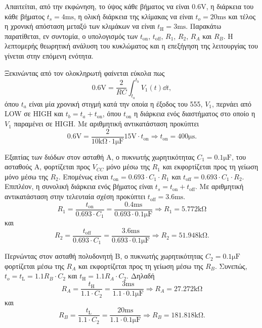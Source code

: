 Απαιτείται, από την εκφώνηση, το ύψος κάθε βήματος να είναι $0.6\unit{\volt}$, η διάρκεια του κάθε βήματος $t_s=4\unit{\ms}$, η ολική διάρκεια της κλίμακας να είναι $t_o=20\unit{\ms}$ και τέλος η χρονική απόσταση μεταξύ των κλιμάκων να είναι $t_{\mathrm{H}}=3\unit{\ms}$. Παρακάτω παρατίθεται, εν συντομία, ο υπολογισμός των $t_{\mathrm{on}}$, $t_{\mathrm{off}}$, $R_1$, $R_2$, $R_A$ και $R_B$. Η λεπτομερής θεωρητική ανάλυση του κυκλώματος και η επεξήγηση της λειτουργίας του γίνεται στην επόμενη ενότητα.\par
Ξεκινώντας από τον ολοκληρωτή φαίνεται εύκολα πως
\begin{equation*}
	0.6\unit{\volt}=\frac{2}{RC}\int_{t_a}^{t_b}{V_1(t)\dd{t}},
\end{equation*}
όπου $t_a$ είναι μία χρονική στιγμή κατά την οποία η έξοδος του 555, $V_1$, περνάει από LOW σε HIGH και $t_b=t_a+t_{\mathrm{on}}$, όπου $t_{\mathrm{on}}$ η διάρκεια ενός διαστήματος στο οποίο η $V_1$ παραμένει σε HIGH. Με αριθμητική αντικατάσταση προκύπτει
\begin{equation*}
	0.6\unit{\volt}=\frac{2}{10\unit{\kilo\ohm}\cdot 1\unit{\micro\farad}}15\unit{\volt}\cdot t_{\mathrm{on}}\Rightarrow t_{\mathrm{on}}=400\unit{\micro\second}.
\end{equation*}

Εξαιτίας των διόδων στον ασταθή Α, ο πυκνωτής χωρητικότητας $C_1=0.1\unit{\micro\farad}$, του ασταθούς  Α, φορτίζεται προς $V_{CC}$ μόνο μέσω της $R_1$ και εκφορτίζεται προς τη γείωση μόνο μέσω της $R_2$. Επομένως είναι $t_{\mathrm{on}}=0.693\cdot C_1\cdot R_1$ και $t_{\mathrm{off}}=0.693\cdot C_1\cdot R_2$. Επιπλέον, η συνολική διάρκεια ενός βήματος είναι $t_s=t_{\mathrm{on}}+t_{\mathrm{off}}$. Με αριθμητική αντικατάσταση στην τελευταία σχέση προκύπτει $t_{\mathrm{off}}=3.6\unit{\ms}$.
\begin{equation*}
	R_1=\frac{t_{\mathrm{on}}}{0.693\cdot C_1}=\frac{0.4\unit{\ms}}{0.693\cdot 0.1\unit{\micro\farad}}\Rightarrow R_1=5.772\unit{\kilo\ohm}
\end{equation*}
και
\begin{equation*}
	R_2=\frac{t_{\mathrm{off}}}{0.693\cdot C_1}=\frac{3.6\unit{\ms}}{0.693\cdot 0.1\unit{\micro\farad}}\Rightarrow R_2=51.948\unit{\kilo\ohm}.
\end{equation*}

Περνώντας στον ασταθή πολυδονητή Β, ο πυκνωτής χωρητικότητας $C_2=0.1\unit{\micro\farad}$ φορτίζεται μέσω της $R_A$ και εκφορτίζεται προς τη γείωση μέσω της $R_B$. Συνεπώς, $t_o=t_{\mathrm{L}}=1.1R_B\cdot C_2$ και $t_{\mathrm{H}}=1.1R_A\cdot C_2$. Δηλαδή
\begin{equation*}
	R_Α=\frac{t_{\mathrm{H}}}{1.1\cdot C_2}=\frac{3\unit{\ms}}{1.1\cdot 0.1\unit{\micro\farad}}\Rightarrow R_A=27.272\unit{\kilo\ohm}
\end{equation*}
και
\begin{equation*}
	R_B=\frac{t_{\mathrm{L}}}{1.1\cdot C_2}=\frac{20\unit{\ms}}{1.1\cdot 0.1\unit{\micro\farad}}\Rightarrow R_B=181.818\unit{\kilo\ohm}.
\end{equation*}